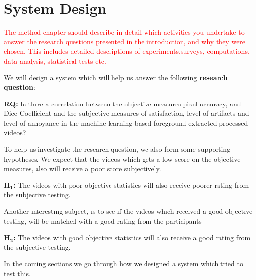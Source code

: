 \chapter{System Design}\label{cha:system_design}
%

\textcolor{red}{The method chapter should describe in detail which activities you undertake to answer the research questions presented in the introduction, and why they were chosen. This includes detailed descriptions of experiments,surveys, computations, data analysis, statistical tests etc.}

We will design a system which will help us answer the following \textbf{research question}:
\begin{tcolorbox}

\begin{displayquote}
    $\mathbf{RQ}$\textbf{:} Is there a correlation between the objective measures pixel accuracy,  and Dice Coefficient and the subjective measures of satisfaction, level of artifacts and level of annoyance in the machine learning based foreground extracted processed videos?
\end{displayquote}

\end{tcolorbox}


To help us investigate the research question, we also form some supporting hypotheses. We expect that the videos which gets a low score on the objective measures, also will receive a poor score subjectively. 
\begin{tcolorbox}
\begin{displayquote}
    $\mathbf{H_1}$\textbf{:} The videos with poor objective statistics will also receive poorer rating from the subjective testing.
\end{displayquote}
\end{tcolorbox}

Another interesting subject, is to see if the videos which received a good objective testing, will be matched with a good rating from the participants

\begin{tcolorbox}
\begin{displayquote}
    $\mathbf{H_2}$\textbf{:} The videos with good objective statistics will also receive a good rating from the subjective testing.
\end{displayquote}
\end{tcolorbox}

In the coming sections we go through how we designed a system which tried to test this. 



